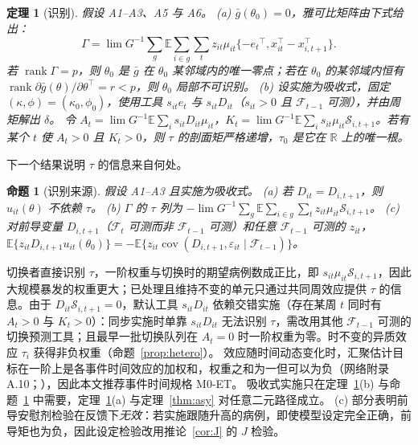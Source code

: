 \documentclass[11pt,a4paper]{ctexart}
\newtheorem{theorem}{定理}
\newtheorem{proposition}{命题}
\theoremstyle{definition}
\newcommand{\E}{\mathbb{E}}
\newcommand{\F}{\mathcal{F}}
\newcommand{\Sw}{\mathcal{S}}
\DeclareMathOperator{\cov}{cov}
\begin{document}
\begin{theorem}[识别]
\label{thm:ident}
假设 A1--A3、A5 与 A6。
(a) $\bar g(\theta_0)=0$，雅可比矩阵由下式给出：
\[
\Gamma=\lim G^{-1}\sum_g\E\sum_{i\in g}\sum_{t}z_{it}\mu_{it}\{-{e_t}^{\top},x_{it}^{\top}-x_{i,t+1}^{\top}\}.
\]
若 $\operatorname{rank}\Gamma=p$，则 $\theta_0$ 是 $\bar g$ 在 $\theta_0$ 某邻域内的唯一零点；若在 $\theta_0$ 的某邻域内恒有 $\operatorname{rank}\partial\bar g(\theta)/\partial\theta^{\top}=r<p$，则 $\theta_0$ 局部不可识别。
(b) 设实施为吸收式，固定 $(\kappa,\phi)=(\kappa_0,\phi_0)$，使用工具 $s_{it}e_t$ 与 $s_{it}D_{it}$（$s_{it}>0$ 且 $\F_{t-1}$ 可测），并由周矩解出 $\delta$。
令 $A_t=\lim G^{-1}\E\sum_i s_{it}D_{it}\mu_{it}$，$K_t=\lim G^{-1}\E\sum_i s_{it}\mu_{it}\Sw_{i,t+1}$。若有某个 $t$ 使 $A_t>0$ 且 $K_t>0$，则 $\tau$ 的剖面矩严格递增，$\tau_0$ 是它在 $\mathbb R$ 上的唯一根。
\end{theorem}

下一个结果说明 $\tau$ 的信息来自何处。

\begin{proposition}[识别来源]
\label{prop:sources}
假设 A1--A3 且实施为吸收式。
(a) 若 $D_{it}=D_{i,t+1}$，则 $u_{it}(\theta)$ 不依赖 $\tau$。
(b) $\Gamma$ 的 $\tau$ 列为 $-\lim G^{-1}\sum_g\E\sum_{i\in g}\sum_t z_{it}\mu_{it}\Sw_{i,t+1}$。
(c) 对前导变量 $D_{i,t+1}$（$\F_t$ 可测而非 $\F_{t-1}$ 可测）和任意 $\F_{t-1}$ 可测的 $z_{it}$，$\E\{z_{it}D_{i,t+1}u_{it}(\theta_0)\}=-\E\{z_{it}\cov(D_{i,t+1},\varepsilon_{it}\mid\F_{t-1})\}$。
\end{proposition}

切换者直接识别 $\tau$，一阶权重与切换时的期望病例数成正比，即 $s_{it}\mu_{it}\Sw_{i,t+1}$，因此大规模暴发的权重更大；已处理且维持不变的单元只通过共同周效应提供 $\tau$ 的信息。由于 $D_{it}\Sw_{i,t+1}=0$，默认工具 $s_{it}D_{it}$ 依赖交错实施（存在某周 $t$ 同时有 $A_t>0$ 与 $K_t>0$）：同步实施时单靠 $s_{it}D_{it}$ 无法识别 $\tau$，需改用其他 $\F_{t-1}$ 可测的切换预测工具；且最早一批切换队列在 $A_t=0$ 时一阶权重为零。时不变的异质效应 $\tau_i$ 获得非负权重（命题~\ref{prop:hetero}）。
效应随时间动态变化时，汇聚估计目标在一阶上是各事件时间效应的加权和，权重之和为一但可以为负（网络附录 A.10；\citealp{goodmanbacon2021did,sun2021estimating}），因此本文推荐事件时间规格 M0-ET。
吸收式实施只在定理~\ref{thm:ident}(b) 与命题~\ref{prop:sources} 中需要，定理~\ref{thm:ident}(a) 与定理~\ref{thm:asy} 对任意二元路径成立。
(c) 部分表明前导安慰剂检验在反馈下\emph{无效}：若实施跟随升高的病例，即使模型设定完全正确，前导矩也为负，因此设定检验改用推论~\ref{cor:J} 的 $J$ 检验。
\end{document}
